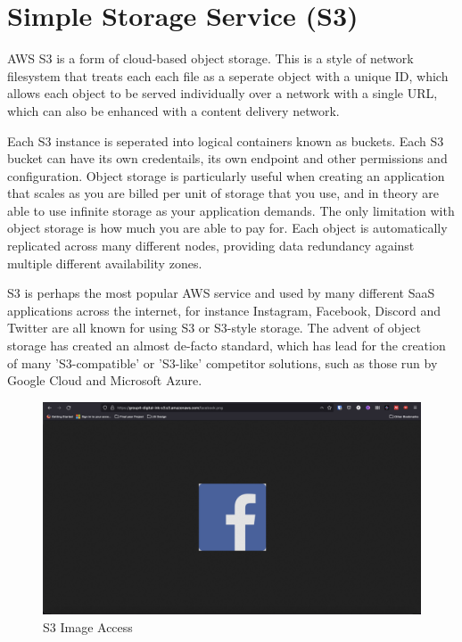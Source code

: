 \chapter{Simple Storage Service (S3)}\label{ch:simple-storage-service}

AWS S3 is a form of cloud-based object storage.
This is a style of network filesystem that treats each each file as a seperate object with a unique ID, which allows each object to be served individually over a network with a single URL, which can also be enhanced with a content delivery network.

Each S3 instance is seperated into logical containers known as buckets. Each S3 bucket can have its own credentails, its own endpoint and other permissions and configuration. Object storage is particularly useful when creating an application that scales as you are billed per unit of storage that you use, and in theory are able to use infinite storage as your application demands. The only limitation with object storage is how much you are able to pay for. Each object is automatically replicated across many different nodes, providing data redundancy against multiple different availability zones.

S3 is perhaps the most popular AWS service and used by many different SaaS applications across the internet, for instance Instagram, Facebook, Discord and Twitter are all known for using S3 or S3-style storage. The advent of object storage has created an almost de-facto standard, which has lead for the creation of many 'S3-compatible' or 'S3-like' competitor solutions, such as those run by Google Cloud and Microsoft Azure.

\begin{figure}
    \centering
    \includegraphics[width=\textwidth]{resources/s3/s3-image-displayed.png}
    \caption{S3 Image Access}
    \label{fig:s3-image}
\end{figure}
